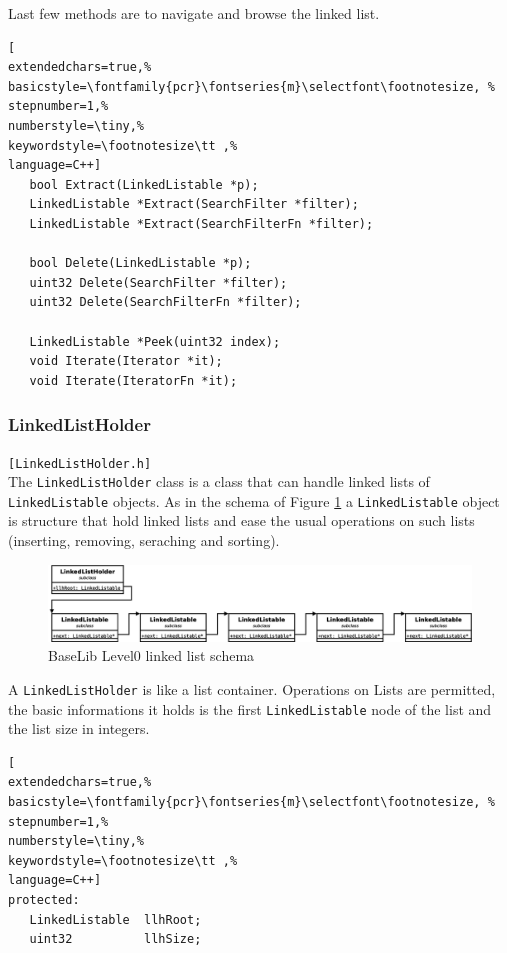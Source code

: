 Last few methods are to navigate and browse the linked list.

\begin{lstlisting}[
extendedchars=true,%
basicstyle=\fontfamily{pcr}\fontseries{m}\selectfont\footnotesize, %
stepnumber=1,%
numberstyle=\tiny,%
keywordstyle=\footnotesize\tt ,%
language=C++]
   bool Extract(LinkedListable *p);
   LinkedListable *Extract(SearchFilter *filter);
   LinkedListable *Extract(SearchFilterFn *filter);

   bool Delete(LinkedListable *p);
   uint32 Delete(SearchFilter *filter);
   uint32 Delete(SearchFilterFn *filter);

   LinkedListable *Peek(uint32 index);
   void Iterate(Iterator *it);
   void Iterate(IteratorFn *it);
\end{lstlisting}



\subsubsection{LinkedListHolder}
\texttt{[LinkedListHolder.h]}\\
The \texttt{LinkedListHolder} class is a class that can handle linked lists of \texttt{LinkedListable} objects. As in the schema of Figure \ref{f:level0:linkedlist} a \texttt{LinkedListable} object is structure that hold linked lists and ease the usual operations on such lists (inserting, removing, seraching and sorting).

\begin{figure}[h!]
 \begin{center}
  \includegraphics[width=\textwidth]{level0/linkedlist.eps}
  \caption{BaseLib Level0 linked list schema}
  \label{f:level0:linkedlist}
 \end{center}
\end{figure}

A \texttt{LinkedListHolder} is like a list container. Operations on Lists are permitted, the basic informations it holds is the first \texttt{LinkedListable} node of the list and the list size in integers.

\begin{lstlisting}[
extendedchars=true,%
basicstyle=\fontfamily{pcr}\fontseries{m}\selectfont\footnotesize, %
stepnumber=1,%
numberstyle=\tiny,%
keywordstyle=\footnotesize\tt ,%
language=C++]
protected:
   LinkedListable  llhRoot;
   uint32          llhSize;
\end{lstlisting}

